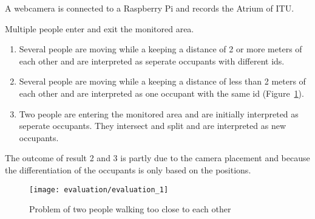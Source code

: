 A webcamera is connected to a Raspberry Pi and records the Atrium of ITU.

Multiple people enter and exit the monitored area.

\begin{enumerate}
\item Several people are moving while a keeping a distance of 2 or more meters of each other and are interpreted as seperate occupants with different ids.
\item Several people are moving while a keeping a distance of less than 2 meters of each other and are interpreted as one occupant with the same id (Figure~\ref{fig:evaluation_1}).
\item Two people are entering the monitored area and are initially interpreted as seperate occupants. They intersect and split and are interpreted as new occupants.
\end{enumerate}

The outcome of result 2 and 3 is partly due to the camera placement and because the differentiation of the occupants is only based on the positions. 

\begin{figure}[htb]
	\centering
	\texttt{[image: evaluation/evaluation\_1]}
	\caption{Problem of two people walking too close to each other}
	\label{fig:evaluation_1}
\end{figure}

